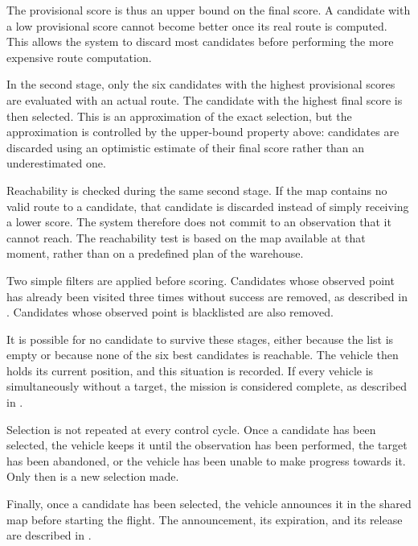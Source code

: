 The provisional score is thus an upper bound on the final score. A candidate with
a low provisional score cannot become better once its real route is computed.
This allows the system to discard most candidates before performing the more
expensive route computation.

In the second stage, only the six candidates with the highest provisional scores
are evaluated with an actual route. The candidate with the highest final score is
then selected. This is an approximation of the exact selection, but the
approximation is controlled by the upper-bound property above: candidates are
discarded using an optimistic estimate of their final score rather than an
underestimated one.

Reachability is checked during the same second stage. If the map contains no
valid route to a candidate, that candidate is discarded instead of simply
receiving a lower score. The system therefore does not commit to an observation
that it cannot reach. The reachability test is based on the map available at that
moment, rather than on a predefined plan of the warehouse.

Two simple filters are applied before scoring. Candidates whose observed point
has already been visited three times without success are removed, as described in
. Candidates whose observed point is blacklisted are
also removed.

It is possible for no candidate to survive these stages, either because the list
is empty or because none of the six best candidates is reachable. The vehicle
then holds its current position, and this situation is recorded. If every vehicle
is simultaneously without a target, the mission is considered complete, as
described in .

Selection is not repeated at every control cycle. Once a candidate has been
selected, the vehicle keeps it until the observation has been performed, the
target has been abandoned, or the vehicle has been unable to make progress
towards it. Only then is a new selection made.

Finally, once a candidate has been selected, the vehicle announces it in the
shared map before starting the flight. The announcement, its expiration, and its
release are described in .

